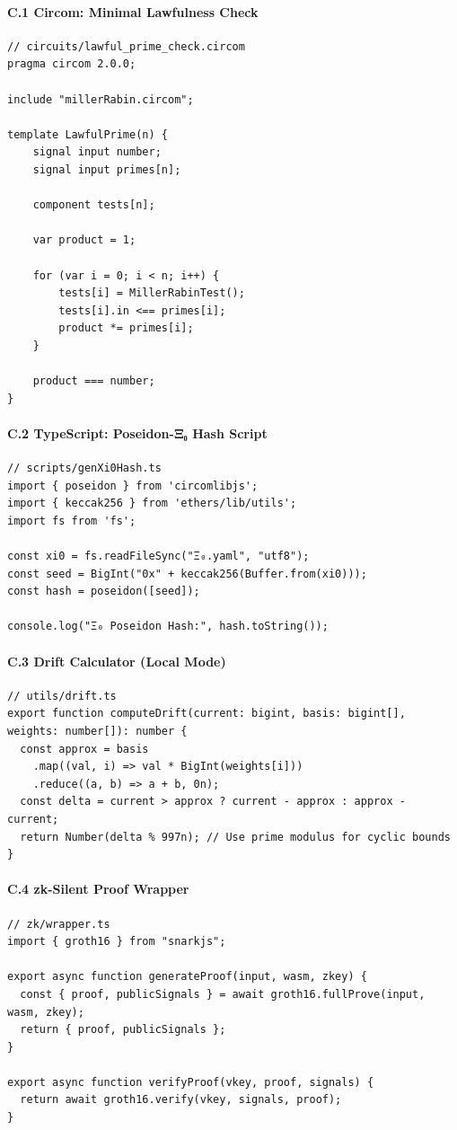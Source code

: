 \documentclass[12]{amsart}
\theoremstyle{plain}
\begin{document}
\paragraph{C.1 Circom: Minimal Lawfulness Check}
\begin{verbatim}
// circuits/lawful_prime_check.circom
pragma circom 2.0.0;

include "millerRabin.circom";

template LawfulPrime(n) {
    signal input number;
    signal input primes[n];

    component tests[n];

    var product = 1;

    for (var i = 0; i < n; i++) {
        tests[i] = MillerRabinTest();
        tests[i].in <== primes[i];
        product *= primes[i];
    }

    product === number;
}
\end{verbatim}

\paragraph{C.2 TypeScript: Poseidon-Ξ₀ Hash Script}
\begin{verbatim}
// scripts/genXi0Hash.ts
import { poseidon } from 'circomlibjs';
import { keccak256 } from 'ethers/lib/utils';
import fs from 'fs';

const xi0 = fs.readFileSync("Ξ₀.yaml", "utf8");
const seed = BigInt("0x" + keccak256(Buffer.from(xi0)));
const hash = poseidon([seed]);

console.log("Ξ₀ Poseidon Hash:", hash.toString());
\end{verbatim}

\paragraph{C.3 Drift Calculator (Local Mode)}
\begin{verbatim}
// utils/drift.ts
export function computeDrift(current: bigint, basis: bigint[], weights: number[]): number {
  const approx = basis
    .map((val, i) => val * BigInt(weights[i]))
    .reduce((a, b) => a + b, 0n);
  const delta = current > approx ? current - approx : approx - current;
  return Number(delta % 997n); // Use prime modulus for cyclic bounds
}
\end{verbatim}

\paragraph{C.4 zk-Silent Proof Wrapper}
\begin{verbatim}
// zk/wrapper.ts
import { groth16 } from "snarkjs";

export async function generateProof(input, wasm, zkey) {
  const { proof, publicSignals } = await groth16.fullProve(input, wasm, zkey);
  return { proof, publicSignals };
}

export async function verifyProof(vkey, proof, signals) {
  return await groth16.verify(vkey, signals, proof);
}
\end{verbatim}
\end{document}
